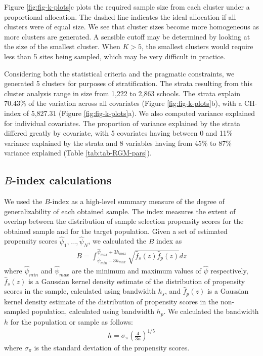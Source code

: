 \documentclass[
  english,
  man,floatsintext]{apa6}
\begin{document}
Figure \ref{fig:fig-k-plots}c plots the required sample size from each cluster under a proportional allocation. The dashed line indicates the ideal allocation if all clusters were of equal size. We see that cluster sizes become more homogeneous as more clusters are generated. A sensible cutoff may be determined by looking at the size of the smallest cluster. When \(K > 5\), the smallest clusters would require less than 5 sites being sampled, which may be very difficult in practice.

Considering both the statistical criteria and the pragmatic constraints, we generated 5 clusters for purposes of stratification. The strata resulting from this cluster analysis range in size from 1,222 to 2,863 schools. The strata explain 70.43\% of the variation across all covariates (Figure \ref{fig:fig-k-plots}b), with a CH-index of 5,827.31 (Figure \ref{fig:fig-k-plots}a). We also computed variance explained for individual covariates. The proportion of variance explained by the strata differed greatly by covariate, with 5 covariates having between 0 and 11\% variance explained by the strata and 8 variables having from 45\% to 87\% variance explained (Table \ref{tab:tab-RGM-pars}).

\hypertarget{B-index}{%
\subsection{\texorpdfstring{\(B\)-index calculations}{B-index calculations}}\label{B-index}}

We used the \(B\)-index as a high-level summary measure of the degree of generalizability of each obtained sample. The index measures the extent of overlap between the distribution of sample selection propensity scores for the obtained sample and for the target population.
Given a set of estimated propensity scores \(\hat\psi_1,...,\hat\psi_N\), we calculated the \(B\) index as
\begin{align}
B = \int_{\hat\psi_{min}-3h_{max}}^{\hat\psi_{max}+3h_{max}}\sqrt{\hat{f}_s(z)\hat{f}_p(z)}dz
\end{align}
where \(\hat\psi_{min}\) and \(\hat\psi_{max}\) are the minimum and maximum values of \(\hat\psi\) respectively, \(\hat{f}_s(z)\) is a Gaussian kernel density estimate of the distribution of propensity scores in the sample, calculated using bandwidth \(h_s\), and \(\hat{f}_p(z)\) is a Gaussian kernel density estimate of the distribution of propensity scores in the non-sampled population, calculated using bandwidth \(h_p\). We calculated the bandwidth \(h\) for the population or sample as follows:
\begin{align}
h = \sigma_{\pi}\left(\frac{4}{3n}\right)^{1/5}
\end{align}
where \(\sigma_{\pi}\) is the standard deviation of the propensity scores.
\end{document}
